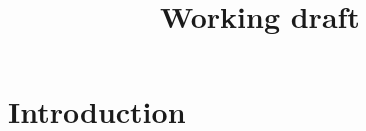 \documentclass[11pt]{article}
\title{Working draft}
\author{}
\date{}
\newtheorem{result}{Result}
\newcommand{\card}[1]{\textsuperscript{\texttt{[#1]}}}
\begin{document}
\maketitle

\begin{abstract}
\end{abstract}

\section{Introduction}

%
%



\end{document}
